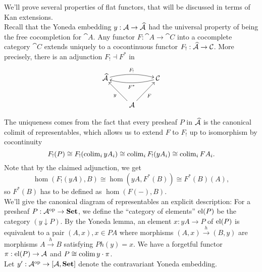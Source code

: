 We'll prove several properties of flat functors, that will be discussed in terms of Kan extensions. \\


Recall that the Yoneda embedding $y : \mathcal{A} \to \widehat{\mathcal{A}}$ had the universal property of being the free cocompletion for $\cat A$. Any functor $F : \cat A \to \cat C$ into a cocomplete category $\cat C$ extends uniquely to a cocontinuous functor $F_!: \widehat{\mathcal{A}} \to \mathcal{C}$. More precisely, there is an adjunction $F_! \dashv F^*$ in
\[
\xymatrix{
\pre{\cat A} \ar@/^/[rr]^{F_!} & & \cat C \ar@/^/[ll]^{F^*} \\
& \cat A \ar[lu]^{y} \ar[ru]_{F}
}\]

The uniqueness comes from the fact that every presheaf $P$ in $\widehat{\mathcal{A}}$ is the canonical colimit of representables, which allows us to extend $F$ to $F_!$ up to isomorphism by cocontinuity
\[ F_!(P) \cong F_!(\operatorname{colim}_i yA_i) \cong \operatorname{colim}_i F_!(yA_i) \cong \operatorname{colim}_i FA_i. \]
Note that by the claimed adjunction, we get
\[ \hom(F_!(yA),B) \cong \hom(yA,F^*(B)) \cong F^*(B)(A), \]
so $F^*(B)$ has to be defined as $\hom(F(-),B)$. \\

We'll give the canonical diagram of representables an explicit description: For a presheaf $P : \mathcal{A}^{\textrm{op}} \to \mathbf{Set}$, we define the ``category of elements'' $\textrm{el}(P)$ be the category $(y \downarrow P)$. By the Yoneda lemma, an element $x : yA \to P$ of $\textrm{el}(P)$ is equivalent to a pair $(A,x), x \in PA$ where morphisms $(A,x) \xrightarrow{h} (B,y)$ are morphisms $A \xrightarrow{h} B$ satisfying $Ph(y) = x$. We have a forgetful functor $\pi : \textrm{el}(P) \to \mathcal{A}$ and $P \cong \operatorname{colim} y\cdot \pi$. \\

Let $y' : \mathcal{A}^{\textrm{op}} \to [\mathcal{A},\mathbf{Set}]$ denote the contravariant Yoneda embedding.

